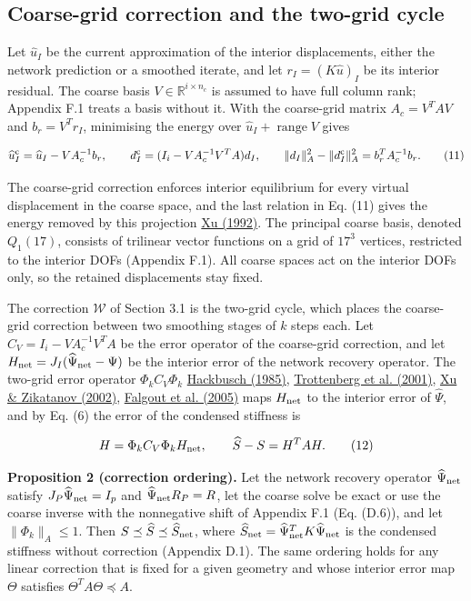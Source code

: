 \documentclass[preprint,12pt,authoryear]{elsarticle}
\begin{document}
\subsection{Coarse-grid correction and the two-grid cycle}

Let \(\widehat u_I\) be the current approximation of the interior displacements, either the network prediction or a smoothed iterate, and let \(r_I=(K\widehat u)_I\) be its interior residual. The coarse basis \(V\in\mathbb R^{i\times n_c}\) is assumed to have full column rank; Appendix F.1 treats a basis without it. With the coarse-grid matrix \(A_c=V^TAV\) and \(b_r=V^Tr_I\), minimising the energy over \(\widehat u_I+\operatorname{range}V\) gives

\[
\widehat u_I^{\rm c}=\widehat u_I-VA_c^{-1}b_r,\qquad
d_I^{\rm c}=(I_i-VA_c^{-1}V^TA)d_I,\qquad
\|d_I\|_A^2-\|d_I^{\rm c}\|_A^2=b_r^TA_c^{-1}b_r.
\tag{11}
\]

The coarse-grid correction enforces interior equilibrium for every virtual displacement in the coarse space, and the last relation in Eq. (11) gives the energy removed by this projection \href{https://doi.org/10.1137/1034116}{Xu (1992)}. The principal coarse basis, denoted \(Q_1(17)\), consists of trilinear vector functions on a grid of \(17^3\) vertices, restricted to the interior DOFs (Appendix F.1). All coarse spaces act on the interior DOFs only, so the retained displacements stay fixed.

The correction \(\mathcal W\) of Section 3.1 is the two-grid cycle, which places the coarse-grid correction between two smoothing stages of \(k\) steps each. Let \(C_V=I_i-VA_c^{-1}V^TA\) be the error operator of the coarse-grid correction, and let \(H_{\rm net}=J_I(\widehat\Psi_{\rm net}-\Psi)\) be the interior error of the network recovery operator. The two-grid error operator \(\Phi_kC_V\Phi_k\) \href{https://doi.org/10.1007/978-3-662-02427-0}{Hackbusch (1985)}, \href{https://shop.elsevier.com/books/multigrid/trottenberg/978-0-12-701070-0}{Trottenberg et al. (2001)}, \href{https://doi.org/10.1090/S0894-0347-02-00398-3}{Xu \& Zikatanov (2002)}, \href{https://doi.org/10.1002/nla.437}{Falgout et al. (2005)} maps \(H_{\rm net}\) to the interior error of \(\widehat\Psi\), and by Eq. (6) the error of the condensed stiffness is

\[
H=\Phi_kC_V\Phi_kH_{\rm net},\qquad
\widehat S-S=H^TAH.
\tag{12}
\]

\textbf{Proposition 2 (correction ordering).} Let the network recovery operator \(\widehat\Psi_{\rm net}\) satisfy \(J_P\widehat\Psi_{\rm net}=I_p\) and \(\widehat\Psi_{\rm net}R_P=R\), let the coarse solve be exact or use the coarse inverse with the nonnegative shift of Appendix F.1 (Eq. (D.6)), and let \(\|\Phi_k\|_A\le1\). Then \(S\preceq\widehat S\preceq\widehat S_{\rm net}\), where \(\widehat S_{\rm net}=\widehat\Psi_{\rm net}^TK\widehat\Psi_{\rm net}\) is the condensed stiffness without correction (Appendix D.1). The same ordering holds for any linear correction that is fixed for a given geometry and whose interior error map \(\Theta\) satisfies \(\Theta^TA\Theta\preceq A\).
\end{document}
